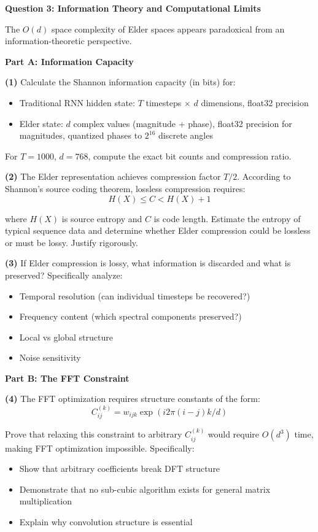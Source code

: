 \begin{critical}
\textbf{Question 3: Information Theory and Computational Limits}

The $O(d)$ space complexity of Elder spaces appears paradoxical from an information-theoretic perspective.

\textbf{Part A: Information Capacity}

\textbf{(1)} Calculate the Shannon information capacity (in bits) for:
\begin{itemize}
\item Traditional RNN hidden state: $T$ timesteps $\times$ $d$ dimensions, float32 precision
\item Elder state: $d$ complex values (magnitude + phase), float32 precision for magnitudes, quantized phases to $2^{16}$ discrete angles
\end{itemize}

For $T=1000$, $d=768$, compute the exact bit counts and compression ratio.

\textbf{(2)} The Elder representation achieves compression factor $T/2$. According to Shannon's source coding theorem, lossless compression requires:
$$H(X) \leq C < H(X) + 1$$

where $H(X)$ is source entropy and $C$ is code length. Estimate the entropy of typical sequence data and determine whether Elder compression could be lossless or must be lossy. Justify rigorously.

\textbf{(3)} If Elder compression is lossy, what information is discarded and what is preserved? Specifically analyze:
\begin{itemize}
\item Temporal resolution (can individual timesteps be recovered?)
\item Frequency content (which spectral components preserved?)
\item Local vs global structure
\item Noise sensitivity
\end{itemize}

\textbf{Part B: The FFT Constraint}

\textbf{(4)} The FFT optimization requires structure constants of the form:
$$C_{ij}^{(k)} = w_{ijk} \exp(i2\pi(i-j)k/d)$$

Prove that relaxing this constraint to arbitrary $C_{ij}^{(k)}$ would require $O(d^3)$ time, making FFT optimization impossible. Specifically:
\begin{itemize}
\item Show that arbitrary coefficients break DFT structure
\item Demonstrate that no sub-cubic algorithm exists for general matrix multiplication
\item Explain why convolution structure is essential
\end{itemize}


\end{critical}
